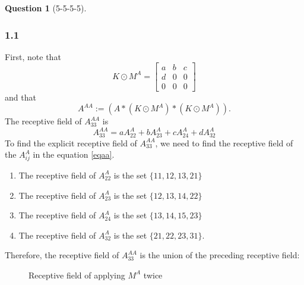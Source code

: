 \documentclass[12pt]{article}
\theoremstyle{definition}
\newtheorem{exercise}{Question}%
\begin{document}
\begin{exercise}[5-5-5-5]
{  \subsubsection*{1.1}
  First, note that
  \begin{equation}
    K \odot M^{A} =
        \begin{bmatrix}
            a & b & c \\
            d & 0 & 0 \\
            0 & 0 & 0
        \end{bmatrix}
        \label{kma}
    \end{equation}
    and that
    \begin{equation}
      A^{AA} := (A * (K \odot M^{A}) * (K \odot M^{A})).
      \label{aaa}
    \end{equation}
    The receptive field of $A_{33}^{AA}$ is
    \begin{equation}
      A^{AA}_{33} = aA^{A}_{22} +  b A^{A}_{23} + c   A^{A}_{24} + d A^{A}_{32}
    \label{eqaa}
    \end{equation}
    To find the explicit receptive field of $A^{AA}_{33}$, we
    need to find the receptive field of the $A^{A}_{ij}$ in the equation \ref{eqaa}.
    \begin{enumerate}
        \item The receptive field of  $A^{A}_{22}$ is the set $\{11, 12 ,13, 21\}$
        \item The receptive field of  $A^{A}_{23}$ is the set $\{12, 13 ,14, 22\}$
        \item The receptive field of  $A^{A}_{24}$ is the set $\{13, 14 ,15, 23\}$
        \item The receptive field of  $A^{A}_{32}$ is the set $\{21, 22 ,23, 31\}$.
    \end{enumerate}
    Therefore, the receptive field of $A^{AA}_{33}$ is the union of the
    preceding receptive field:
    \begin{figure}[h]
    \centering
    \caption{Receptive field of applying $M^{A}$ twice}
    \label{fig:pixcnn5}
    \end{figure}

}
\end{exercise}
\end{document}
